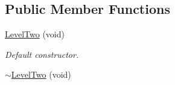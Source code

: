 \subsection*{Public Member Functions}
\begin{DoxyCompactItemize}
\item 
\hypertarget{class_level_two_ac57f1c4fa86d64e22a6d013af7afd886}{\hyperlink{class_level_two_ac57f1c4fa86d64e22a6d013af7afd886}{Level\-Two} (void)}\label{class_level_two_ac57f1c4fa86d64e22a6d013af7afd886}

\begin{DoxyCompactList}\small\item\em Default constructor. \end{DoxyCompactList}\item 
\hypertarget{class_level_two_aef76b8626bd780d32f3718f9a0000f68}{\hyperlink{class_level_two_aef76b8626bd780d32f3718f9a0000f68}{$\sim$\-Level\-Two} (void)}\label{class_level_two_aef76b8626bd780d32f3718f9a0000f68}


\end{DoxyCompactItemize}
